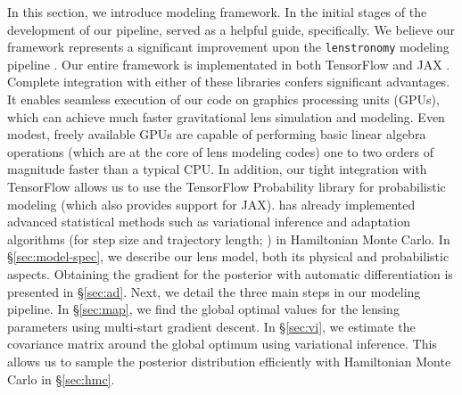In this section, we introduce  modeling framework. 
In the initial stages of the development of our pipeline, \lenstr served as a helpful guide,
specifically. We believe our framework represents a significant improvement upon the \texttt{lenstronomy} modeling pipeline .
Our entire framework is  
implementated in both TensorFlow \citep{TensorFlow} and JAX \citep{bradbury2018a}. Complete integration with either of these libraries confers significant advantages.
It enables seamless execution of our code on graphics processing units (GPUs), which 
can achieve much faster gravitational lens simulation and modeling. 
Even modest, freely available GPUs
are capable of performing basic linear algebra operations 
(which are at the core of lens modeling codes) one to two orders of magnitude faster than a typical CPU. 
In addition, our tight integration with TensorFlow allows us to use the TensorFlow Probability \citep{dillon2017a} library for probabilistic modeling (which also provides support for JAX).  has already implemented %
advanced statistical methods such as variational inference and adaptation algorithms (for step size and trajectory length; \citet{hoffman2014,hoffman2021}) in Hamiltonian Monte Carlo. 
In \S\ref{sec:model-spec}, we describe our lens model, both its physical and probabilistic aspects.
Obtaining the gradient for the posterior with automatic differentiation is presented in \S\ref{sec:ad}. 
Next, we detail the three main steps in our modeling pipeline.
In \S\ref{sec:map}, we find the global optimal values for the lensing parameters using multi-start gradient descent.  
In \S\ref{sec:vi}, we estimate the covariance matrix around the global optimum using variational inference.  
This allows us to sample the posterior distribution efficiently with Hamiltonian Monte Carlo in \S\ref{sec:hmc}.


